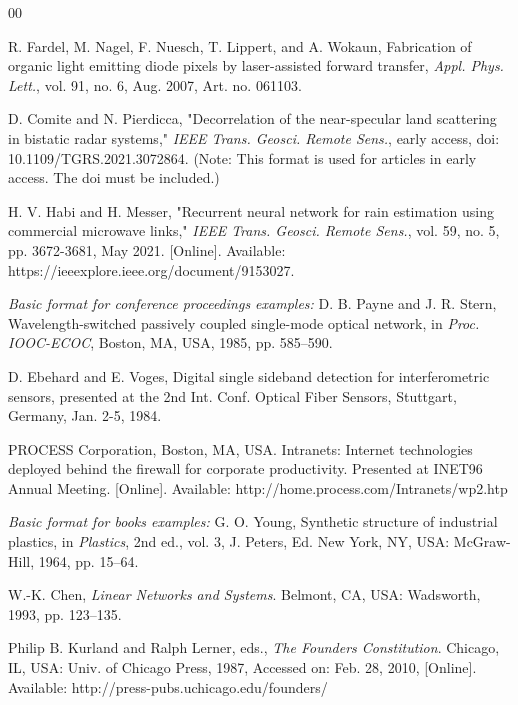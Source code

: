 \documentclass{article}
\begin{document}
\begin{thebibliography}{00}

 R. Fardel, M. Nagel, F. Nuesch, T. Lippert, and A. Wokaun,  Fabrication of organic light emitting diode pixels by laser-assisted forward transfer,  \textit{Appl. Phys. Lett.}, vol. 91, no. 6, Aug. 2007, Art. no. 061103. 

 D. Comite and N. Pierdicca, "Decorrelation of the near-specular land scattering in bistatic radar systems," \textit{IEEE Trans. Geosci. Remote Sens.}, early access, doi: 10.1109/TGRS.2021.3072864. (Note: This format is used for articles in early access. The doi must be included.)

 H. V. Habi and H. Messer, "Recurrent neural network for rain estimation using commercial microwave links," \textit{IEEE Trans. Geosci. Remote Sens.}, vol. 59, no. 5, pp. 3672-3681, May 2021. [Online]. Available: https://ieeexplore.ieee.org/document/9153027.


\textit{Basic format for conference proceedings examples:}
 D. B. Payne and J. R. Stern,  Wavelength-switched passively coupled single-mode optical network,  in \textit{Proc. IOOC-ECOC}, Boston, MA, USA, 1985, pp. 585--590.

 D. Ebehard and E. Voges,  Digital single sideband detection for interferometric sensors,  presented at the 2nd Int. Conf. Optical Fiber Sensors, Stuttgart, Germany, Jan. 2-5, 1984.

 PROCESS Corporation, Boston, MA, USA. Intranets: Internet technologies deployed behind the firewall for corporate productivity. Presented at INET96 Annual Meeting. [Online]. Available:  http://home.process.com/Intranets/wp2.htp


\textit{Basic format for books examples:}
 G. O. Young,  Synthetic structure of industrial plastics,  in \textit{Plastics}, 2nd ed., vol. 3, J. Peters, Ed. New York, NY, USA: McGraw-Hill, 1964, pp. 15--64.

 W.-K. Chen, \textit{Linear Networks and Systems}. Belmont, CA, USA: Wadsworth, 1993, pp. 123--135.

 Philip B. Kurland and Ralph Lerner, eds., \textit{The Founders  Constitution}. Chicago, IL, USA: Univ. of Chicago Press, 1987, Accessed on: Feb. 28, 2010, [Online]. Available: http://press-pubs.uchicago.edu/founders/ 

\end{thebibliography}
\end{document}
